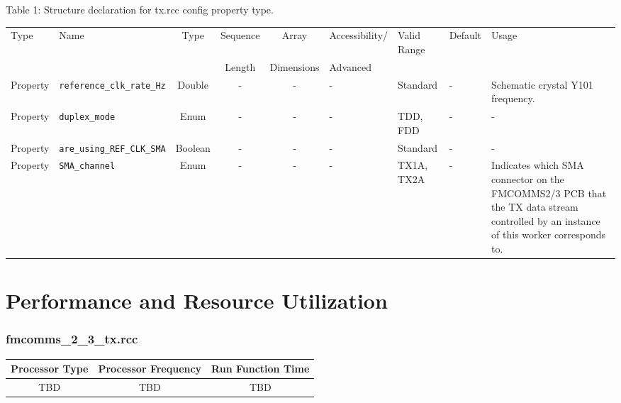 \documentclass{article}
\def\comp{tx}
\begin{document}
\begin{landscape}
	Table \hypertarget{tab1}{1}: Structure declaration for \comp{}.rcc config property type.
	\begin{scriptsize}
		\begin{longtable}{|p{1.8cm}|p{3.6cm}|c|c|c|p{2cm}|p{3.7cm}|p{3.7cm}|p{2.5cm}|}
			\hline
			\rowcolor{blue}
			Type         & Name                                & Type & Sequence & Array      & Accessibility/ & Valid Range  & Default & Usage                                                                                                                                                                                                                       \\
			\rowcolor{blue}
			             &                                     &      & Length   & Dimensions & Advanced       &              &         &                                                                                                                                                                                                                             \\
			\hline
			Property     & \verb+reference_clk_rate_Hz+                   & Double & -        & -          & - & Standard & - & Schematic crystal Y101 frequency. \\
			\hline
			Property     & \verb+duplex_mode+                             & Enum   & -        & -          & - & TDD, FDD & - & - \\
			\hline
			Property     & \verb+are_using_REF_CLK_SMA+                             & Boolean& -        & -          & - & Standard & - & - \\
			\hline
			Property     & \verb+SMA_channel+                                       & Enum   & -        & -          & - & TX1A, TX2A & - & Indicates which SMA connector on the FMCOMMS2/3 PCB that the TX data stream controlled by an instance of this worker corresponds to. \\
			\hline
		\end{longtable}
	\end{scriptsize}

\end{landscape}

\section*{Performance and Resource Utilization}
\subsubsection*{fmcomms\_2\_3\_tx.rcc}
\begin{scriptsize}
	\begin{tabular}{|c|c|c|}
		\hline
		\rowcolor{blue}
		Processor Type & Processor Frequency & Run Function Time \\
		\hline
		TBD            & TBD                 & TBD               \\
		\hline
	\end{tabular}
\end{scriptsize}
\end{document}
